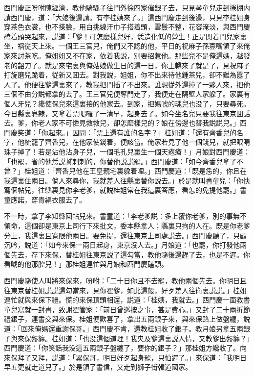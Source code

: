 西門慶正吩咐陳經濟，教他騎騾子往門外徐四家催銀子去，只見琴童兒走到捲棚内請西門慶，道：「大娘後邊請。有李桂姨來了。」這西門慶走到後邊，只見李桂姐身穿茶色衣裳，也不搽臉，用白挑線汗巾子搭着頭，雲鬟不整，花容淹淡，與西門慶磕着頭哭起來，説道：「爹！可怎麽樣兒好，恁造化低的營生！正是関着門兒家裏坐，祸従天上來。一個王三官兒，俺們又不認的他，平日的祝麻子孫寡嘴領了來俺家來討茶吃。俺姐姐又不在家，依着我説，別要招惹他。那些兒不是俺這媽，越發老的韶刀了。就是來宅裏與俺姑娘做生日的這一日，你上轎來了就是了，見祝麻子打旋磨兒跪着，従新又囬去。對我説，姐姐，你不出來待他鍾茶兒，卻不難為囂了人了。他便往爹這裏來了，教我把門插了不出來。誰想従外邊撞了一夥人來，把他三個不由分説都拿的去了。王三官兒便奪門走了，我便走在隔壁人家躱了。家裏有個人牙兒？纔使保兒來這裏接的他家去。到家，把媽唬的魂兒也没了，只要尋死。今日縣裏皂隸，又拿着票喝囉了一清早，起身去了。如今坐名兒只要我往東京囬話去。爹，你老人家不可憐見救救兒，卻怎麽樣兒的？娘在傍邊也替我説説兒。」西門慶笑道：「你起來。」因問：「票上還有誰的名字？」桂姐道：「還有齊香兒的名字，他梳籠了齊香兒，在他家使錢着，便該當。俺家若見了他一個錢兒，就把眼睛珠子掉了！若是沾他沾身子兒，一個毛孔兒裏生一個天疱瘡！」月娘對西門慶道：「也罷，省的他恁説誓剌剌的，你替他説説罷。」西門慶道：「如今齊香兒拿了不曾？」桂姐道：「齊香兒他在王皇親宅裏躱着哩。」西門慶道：「既是恁的，你且在我這裏住兩日。倘人來尋你，我就差人往縣裏替你説去。」於是就叫書童兒：「你快寫個帖兒，往縣裏見你李老爹，就説桂姐常在我這裏答應，看怎的免提他罷。」書童應諾，穿青絹衣服去了。

不一時，拿了李知縣回帖兒來。書童道：「李老爹説：多上覆你老爹，別的事無不領命，這個卻是東京上司行下來批文，委本縣拿人；縣裏只拘的人在。既是你老爹分上，我這裏且寬限他兩日。要免提，還往東京上司處説去。」西門慶聽了，只顧沉吟，説道：「如今來保一兩日起身，東京沒人去。」月娘道：「也罷，你打發他兩個先去，存下來保，替桂姐往東京説了這勾當，教他隨後邊趕了去，也是不遲。你看唬的他那腔兒！」那桂姐連忙與月娘和西門慶磕頭。

西門慶隨使人叫將來保來，吩咐：「二十日你且不去罷，教他兩個先去。你明日且往東京替桂姐説説這勾當來，見你翟爹，如此這般，好歹差人往衛裏説説。」桂姐連忙就與來保下禮。慌的來保頂頭相還，説道：「桂姨，我就去。」西門慶一面教書童兒寫就一封書，致謝翟管家：「前日曾巡按之事，甚是費心。」又封了二十兩折節禮銀子，連書交與來保。桂姐便歡喜了，拿出五兩銀子來，與來保路上做盤纏，説道：「回來俺媽還重謝保哥。」西門慶不肯，還教桂姐收了銀子。教月娘另拿五兩銀子與來保盤纏。桂姐道：「也没這個道理！我央及爹這裏説人情，又教爹出盤纏？」西門慶道：「你笑話我没這五兩銀子盤纏了，要你的銀子？」那桂姐方纔收了。向來保拜了又拜，説道：「累保哥，明日好歹起身罷，只怕遲了。」來保道：「我明日早五更就走道兒了。」於是領了書信，又走到獅子街韓道國家。


